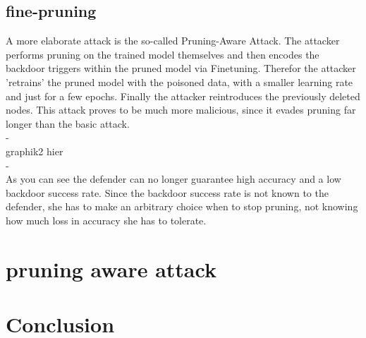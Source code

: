 \documentclass[a4paper,12pt]{report}
\begin{document}
\subsection{fine-pruning}
A more elaborate attack is the so-called Pruning-Aware Attack. The attacker performs pruning on the trained model themselves and then encodes the backdoor triggers within the pruned model via Finetuning. Therefor the attacker 'retrains' the pruned model with the poisoned data, with a smaller learning rate and just for a few epochs. Finally the attacker reintroduces the previously deleted nodes. This attack proves to be much more malicious, since it evades pruning far longer than the basic attack.
\\
-\\
graphik2 hier\\
-\\
As you can see the defender can no longer guarantee high accuracy and a low backdoor success rate. Since the backdoor success rate is not known to the defender, she has to make an arbitrary choice when to stop pruning, not knowing how much loss in accuracy she has to tolerate.
\section{pruning aware attack}




\section{Conclusion}
	
	
	
\listoffigures

	
	
	
	
	
	
	
	
	
	
	
	
	
	
	
	
	
	
	
	
\end{document}
